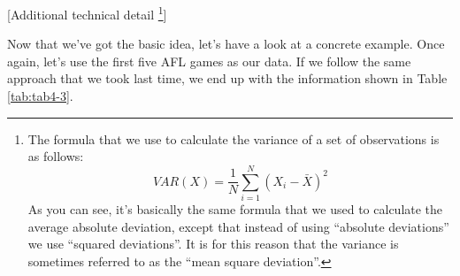 \documentclass[
]{book}
\begin{document}
{ {[}Additional technical detail \footnote{The formula that we use to calculate the variance of a set of observations is as follows: \[VAR(X) =\frac{1}{N} \sum_{i=1}^{N} ( X_i - \bar{X} )^2\] As you can see, it's basically the same formula that we used to calculate the average absolute deviation, except that instead of using ``absolute deviations'' we use ``squared deviations''. It is for this reason that the variance is sometimes referred to as the ``mean square deviation''.}{]}}

Now that we've got the basic idea, let's have a look at a concrete example. Once again, let's use the first five AFL games as our data. If we follow the same approach that we took last time, we end up with the information shown in Table \ref{tab:tab4-3}.

 
  \providecommand{\huxb}[2]{\arrayrulecolor[RGB]{#1}\global\arrayrulewidth=#2pt}
  \providecommand{\huxvb}[2]{\color[RGB]{#1}\vrule width #2pt}
  \providecommand{\huxtpad}[1]{\rule{0pt}{#1}}
  \providecommand{\huxbpad}[1]{\rule[-#1]{0pt}{#1}}
\end{document}
